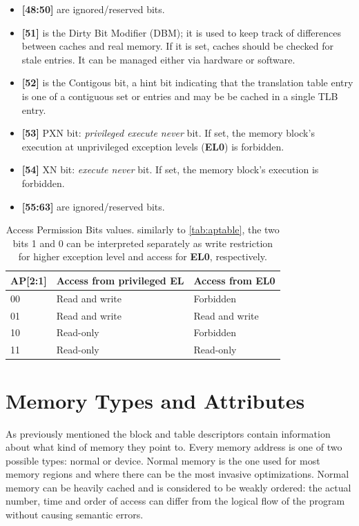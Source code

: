 \documentclass[12pt,a4paper,openright,twoside]{report}
\begin{document}
\begin{itemize}
    \item \textbf{[48:50]} are ignored/reserved bits.
    \item \textbf{[51]} is the Dirty Bit Modifier (DBM); it is used to keep
        track of differences between caches and real memory. If it is set, caches
        should be checked for stale entries. It can be managed either via 
        hardware or software.
    \item \textbf{[52]} is the Contigous bit, a hint bit indicating that the 
        translation table entry is one of a contiguous set or entries and may be
        be cached in a single TLB entry.
    \item \textbf{[53]} PXN bit: \textit{privileged execute never} bit. If set, the memory block's 
        execution at unprivileged exception levels (\textbf{EL0}) is forbidden.
    \item \textbf{[54]} XN bit: \textit{execute never} bit. If set, the memory block's 
        execution is forbidden.
    \item \textbf{[55:63]} are ignored/reserved bits.
\end{itemize}

\begin{table}[]
    \begin{center}
    \begin{tabular}{|l|l|l|}
    \hline
    \rowcolor[HTML]{9B9B9B} 
    AP{[}2:1{]} & Access from privileged EL & Access from EL0 \\ \hline
    00          & Read and write            & Forbidden       \\ \hline
    01          & Read and write            & Read and write  \\ \hline
    10          & Read-only                 & Forbidden       \\ \hline
    11          & Read-only                 & Read-only       \\ \hline
    \end{tabular}
    \caption[APBits]{Access Permission Bits values. similarly to \ref{tab:aptable},
    the two bits 1 and 0 can be interpreted separately as write restriction for higher
    exception level and access for \textbf{EL0}, respectively.}
    \label{tab:apbits}
\end{center}
    \end{table}



\section{Memory Types and Attributes}
\label{mair}
As previously mentioned the block and table descriptors contain information about
what kind of memory they point to.
Every memory address is one of two possible types: normal or device.
Normal memory is the one used for most memory regions and where there can be 
the most invasive optimizations. Normal memory can be heavily cached and is 
considered to be weakly ordered: the actual number, time and order of access can 
differ from the logical flow of the program without causing semantic errors.
\end{document}
